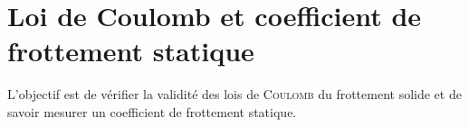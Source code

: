 \documentclass[a4paper,french,bookmarks]{article}
\begin{document}
    \renewcommand{\thesection}{\Roman{section}}
    \renewcommand{\labelenumi}{\thesection.\arabic{enumi}.}
    \renewcommand*{\labelenumii}{\thesection.\arabic{enumi}.\arabic{enumii}.}
    
    
    \section{Loi de Coulomb et coefficient de frottement statique}
    
    L'objectif est de vérifier la validité des lois de \textsc{Coulomb} du frottement solide et de savoir mesurer un coefficient de frottement statique.
    
\end{document}
